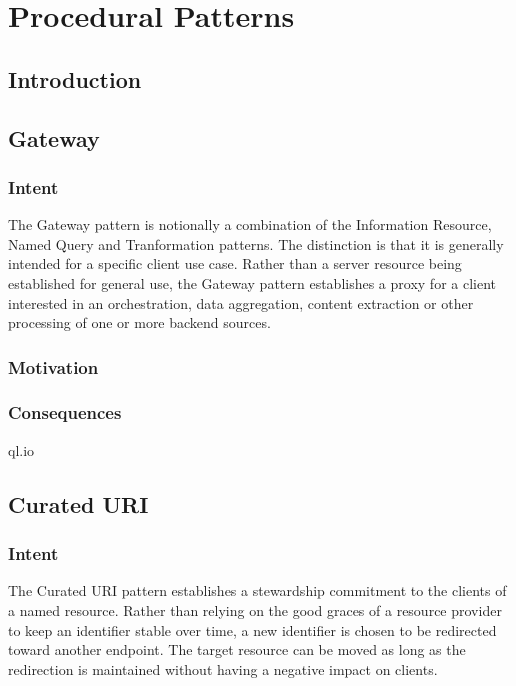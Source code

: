 \chapter{Procedural Patterns}
\label{ch03}

\section{Introduction}
\label{ch03.sec.1}

\newpage
\section{Gateway}
\label{ch03.sec.2}

\subsection{Intent}
\label{ch03.sec.2.intent}
The Gateway pattern is notionally a combination of the Information Resource, Named Query and Tranformation patterns. The distinction is that it is generally intended for a specific client use case. Rather than a server resource being established for general use, the Gateway pattern establishes a proxy for a client interested in an orchestration, data aggregation, content extraction or other processing of one or more backend sources.

\subsection{Motivation}
\label{ch03.sec.2.motivation}

\subsection{Consequences}
\label{ch03.sec.2.consequences}

ql.io

\newpage
\section{Curated URI}
\label{ch03.sec.3}

\subsection{Intent}
\label{ch03.sec.3.intent}
The Curated URI pattern establishes a stewardship commitment to the clients of a named resource. Rather than relying on the good graces of a resource provider to keep an identifier stable over time, a new identifier is chosen to be redirected toward another endpoint. The target resource can be moved as long as the redirection is maintained without having a negative impact on clients.

